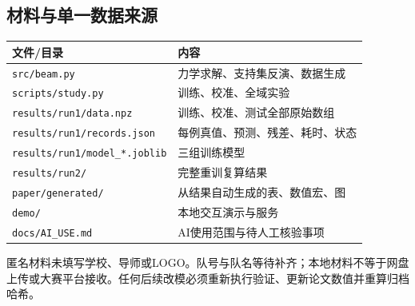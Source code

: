 \documentclass[UTF8,a4paper,11pt,fontset=fandol]{ctexart}
\begin{document}
\subsection*{材料与单一数据来源}
\begin{center}\small\begin{tabular}{ll}\toprule
文件/目录 & 内容\\\midrule
\texttt{src/beam.py} & 力学求解、支持集反演、数据生成\\
\texttt{scripts/study.py} & 训练、校准、全域实验\\
\texttt{results/run1/data.npz} & 训练、校准、测试全部原始数组\\
\texttt{results/run1/records.json} & 每例真值、预测、残差、耗时、状态\\
\texttt{results/run1/model\_*.joblib} & 三组训练模型\\
\texttt{results/run2/} & 完整重训复算结果\\
\texttt{paper/generated/} & 从结果自动生成的表、数值宏、图\\
\texttt{demo/} & 本地交互演示与服务\\
\texttt{docs/AI\_USE.md} & AI使用范围与待人工核验事项\\\bottomrule
\end{tabular}\end{center}
匿名材料未填写学校、导师或LOGO。队号与队名等待补齐；本地材料不等于网盘上传或大赛平台接收。任何后续改模必须重新执行验证、更新论文数值并重算归档哈希。
\end{document}
